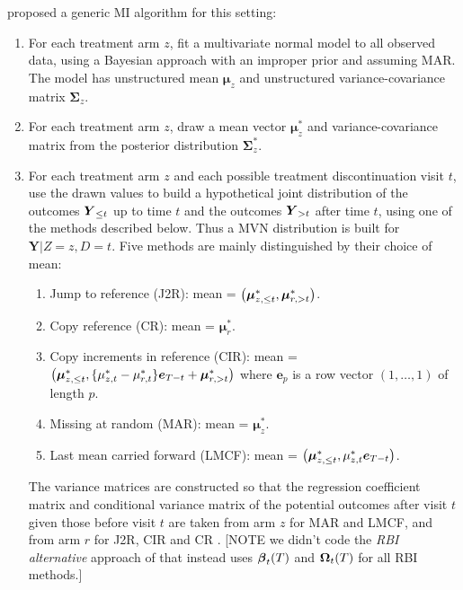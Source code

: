 \citet{Carpenter++13}  proposed a generic MI algorithm for this setting:
\begin{enumerate}

\item For each treatment arm $z$, fit a multivariate normal model to all observed data, using a
    Bayesian approach with an improper prior and assuming MAR. The model has unstructured
    mean $\boldsymbol{\mu}_z$ and unstructured variance-covariance matrix $\boldsymbol{\Sigma}_z$.

\item For each treatment arm $z$, draw a mean vector $\boldsymbol{\mu}_z^*$ and variance-covariance matrix from the
    posterior distribution $\boldsymbol{\Sigma}_z^*$.

\item For each treatment arm  $z$ and each possible treatment discontinuation visit $t$, use the drawn values to build a hypothetical  joint  distribution of 
the outcomes $\boldsymbol{Y}_{{\le{t}}}$ up to time $t$ 
and 
the outcomes $\boldsymbol{Y}_{{>t}}$ after time  $t$, 
using one of the methods described below.
Thus a MVN distribution is built for $\boldsymbol{Y}|Z=z,D=t$.
Five methods are mainly distinguished by their choice of mean: 
\begin{enumerate}
\item Jump to reference (J2R):
mean = $\left( \boldsymbol{\mu}_{z,{\le{t}}}^*, \boldsymbol{\mu}_{r,{>t}}^* \right)$.

\item Copy reference (CR):
mean = $\boldsymbol{\mu}_r^*$.

\item Copy increments in reference (CIR):
mean = $\left( \boldsymbol{\mu}_{z,{\le{t}}}^*,  \{\mu_{z,t}^* - \mu_{r,t}^* \} \boldsymbol{e}_{T-t} + \boldsymbol{\mu}_{r,{>t}}^*   \right)$
where $\boldsymbol{e}_p$ is a row vector $(1,\ldots,1)$ of length $p$.

\item Missing at random (MAR): mean = $\boldsymbol{\mu}_z^*$.

\item Last mean carried forward (LMCF):
mean = $\left( \boldsymbol{\mu}_{z,{\le{t}}}^*, \mu_{z,t}^*\boldsymbol{e}_{T-t} \right)$.
\end{enumerate}

The variance matrices are constructed so that the regression coefficient matrix and conditional variance matrix of the potential outcomes after visit  $t$ given those before visit $t$ are taken from arm $z$ for MAR and LMCF, and from arm $r$ for J2R, CIR and CR 
\citet{Carpenter++13,ian:RBIcausal}.
[NOTE we didn't code the \emph{RBI alternative} approach of \citet{ian:RBIcausal} that instead uses $\boldsymbol{\beta}_t(T)$ and $\boldsymbol{\Omega}_t(T)$ for all RBI methods.]


\end{enumerate}
